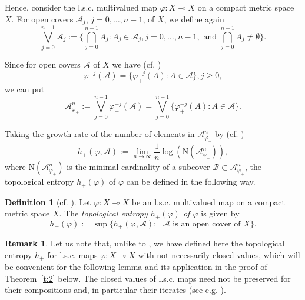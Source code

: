 \documentclass[12pt]{amsart}
\theoremstyle{definition}
\newtheorem{remark}{Remark}
\newtheorem{definition}{Definition}
\newcommand{\NN}{{\mathrm{N}}}
\newcommand{\vp}{\varphi}
\newcommand{\B}{{\mathcal{B}}}
\newcommand{\A}{{\mathcal{A}}}
\begin{document}
Hence, consider the l.s.c. multivalued map $\vp:X\multimap X$ on a compact metric space $X$. For open covers $\A_j$, $j=0,\ldots,n-1$, of $X$, we define again
\[
\bigvee_{j=0}^{n-1} \A_j := \{ \bigcap_{j=0}^{n-1} A_j: A_j\in\A_j, j=0,\ldots,n-1,\mbox{ and } \bigcap_{j=0}^{n-1}A_j\neq\emptyset\}.
\]

Since for open covers $\A$ of $X$ we have (cf. \cite{An,AL1})
\[
\vp^{-j}_+(\A) = \{\vp^{-j}_+(A):A\in\A\}, j\geq0,
\]
we can put
\[
		\A^n_{\vp_+} := \bigvee_{j=0}^{n-1} \vp_{+}^{-j}(\A) = \bigvee_{j=0}^{n-1} \{\vp_{+}^{-j}(A): A\in\A\}.
\]

Taking the growth rate of the number of elements in $\A^n_{\vp_+}$ by (cf. \cite[Lemma 3]{AL1})
\[
h_+(\vp,\A):= \lim_{n\to\infty} \frac1{n} \log(\NN(\A^n_{\vp_+})),
\]
where $\NN(\A^n_{\vp_+})$ is the minimal cardinality of a subcover $\B\subset\A^n_{\vp_+}$, the topological entropy $h_+(\vp)$ of $\vp$ can be defined in the following way.

\begin{definition}[cf. {\cite[Definition 6]{AL1}}]\label{d:4}
Let $\vp:X\multimap X$ be an l.s.c. multivalued map on a compact metric space $X$. The \emph{topological entropy $h_+(\vp)$ of $\vp$} is given by
\[
h_+(\vp):= \sup \{h_+(\vp,\A): \mbox{ $\A$ is an open cover of $X$}\}.
\]
\end{definition}

\begin{remark}
Let us note that, unlike to \cite[Definition 6]{AL1}, we have defined here the topological entropy $h_+$ for l.s.c. maps $\vp:X\multimap X$ with not necessarily closed values, which will be convenient for the following lemma and its application in the proof of Theorem~\ref{t:2} below. The closed values of l.s.c. maps need not be preserved for their compositions and, in particular their iterates (see e.g. \cite{ATDZ,HP}).
\end{remark}
\end{document}
